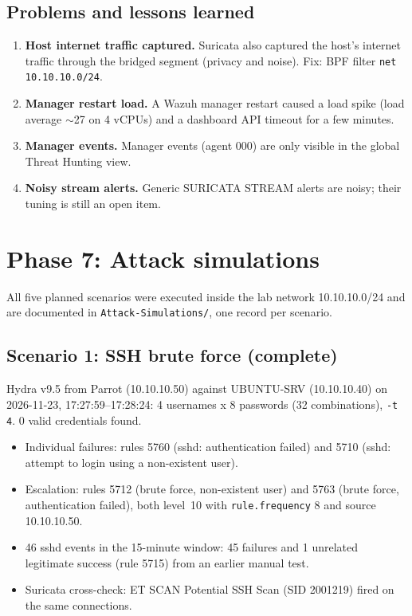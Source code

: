 \documentclass[11pt,a4paper]{article}
\begin{document}
\subsection{Problems and lessons learned}
\begin{enumerate}
  \item \textbf{Host internet traffic captured.} Suricata also captured the
        host's internet traffic through the bridged segment (privacy and
        noise). Fix: BPF filter \texttt{net 10.10.10.0/24}.
  \item \textbf{Manager restart load.} A Wazuh manager restart caused a load
        spike (load average $\sim$27 on 4 vCPUs) and a dashboard API timeout
        for a few minutes.
  \item \textbf{Manager events.} Manager events (agent 000) are only visible
        in the global Threat Hunting view.
  \item \textbf{Noisy stream alerts.} Generic SURICATA STREAM alerts are
        noisy; their tuning is still an open item.
\end{enumerate}

\section{Phase 7: Attack simulations}

All five planned scenarios were executed inside the lab network
10.10.10.0/24 and are documented in \texttt{Attack-Simulations/}, one record
per scenario.

\subsection{Scenario 1: SSH brute force (complete)}

Hydra v9.5 from Parrot (10.10.10.50) against UBUNTU-SRV (10.10.10.40) on
2026-11-23, 17:27:59--17:28:24: 4 usernames x 8 passwords (32 combinations),
\texttt{-t 4}. 0 valid credentials found.

\begin{itemize}
  \item Individual failures: rules 5760 (sshd: authentication failed) and
        5710 (sshd: attempt to login using a non-existent user).
  \item Escalation: rules 5712 (brute force, non-existent user) and 5763
        (brute force, authentication failed), both level~10 with
        \texttt{rule.frequency} 8 and source 10.10.10.50.
  \item 46 sshd events in the 15-minute window: 45 failures and 1 unrelated
        legitimate success (rule 5715) from an earlier manual test.
  \item Suricata cross-check: ET SCAN Potential SSH Scan (SID 2001219) fired
        on the same connections.
\end{itemize}
\end{document}
